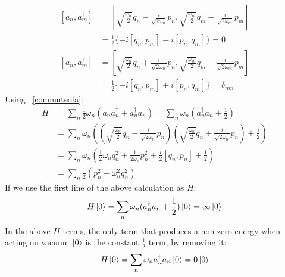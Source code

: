\documentclass{article}
\newcommand{\onehalf}{\frac{1}{2}}
\begin{document}
\begin{equation}
    \begin{split}
    [a_n^\dagger,a_m^\dagger] &= [\sqrt{\frac{\omega_n}{2}}q_n-\frac{i}{\sqrt{2\omega_n}}p_n,
    \sqrt{\frac{\omega_m}{2}}q_m-\frac{i}{\sqrt{2\omega_m}}p_m]\\
    &= \onehalf \{ -i[q_n,p_m] - i[p_n,q_m] \} = 0
\end{split}
\end{equation}
\begin{equation}\label{commuteofa}
    \begin{split}
    [a_n,a_m^\dagger] &= [\sqrt{\frac{\omega_n}{2}}q_n+\frac{i}{\sqrt{2\omega_n}}p_n,
    \sqrt{\frac{\omega_m}{2}}q_m-\frac{i}{\sqrt{2\omega_m}}p_m]\\
    &= \onehalf \{ -i[q_n,p_m] + i[p_n,q_m] \} =\delta_{nm}
\end{split}
\end{equation}
Using ~\ref{commuteofa}:
\begin{equation}
    \begin{split}
    H &= \sum_n \onehalf \omega_n( a_n a_n^\dagger + a_n^\dagger a_n ) = \sum_n \omega_n(a_n^\dagger a_n + \onehalf) \\
    &=  \sum_n \omega_n ((\sqrt{\frac{\omega_n}{2}}q_n-\frac{i}{\sqrt{2\omega_n}}p_n)(\sqrt{\frac{\omega_n}{2}}q_n+\frac{i}{\sqrt{2\omega_n}}p_n) + \onehalf) \\
    &= \sum_n \omega_n(\onehalf\omega_n q_n^2 + \frac{1}{2\omega_n}p_n^2 + \frac{i}{2}[q_n,p_n] + \onehalf) \\
    &= \sum_n \onehalf(p_n^2 + \omega_n^2q_n^2)
\end{split}
\end{equation}
If we use the first line of the above calculation as $H$:
\begin{equation}
    \begin{split}
        H\ket{0} = \sum_n \omega_n(a_n^\dagger a_n + \onehalf)\ket{0} = \infty\ket{0}    
    \end{split}
\end{equation}
In the above $H$ terms, the only term that produces a non-zero energy when acting on vacuum $\ket{0}$ is the constant $\onehalf$ term, by removing it:
\begin{equation}
    \begin{split}
        H\ket{0} = \sum_n\omega_na_n^\dagger a_n\ket{0} = 0\ket{0}
    \end{split}
\end{equation}
\end{document}
